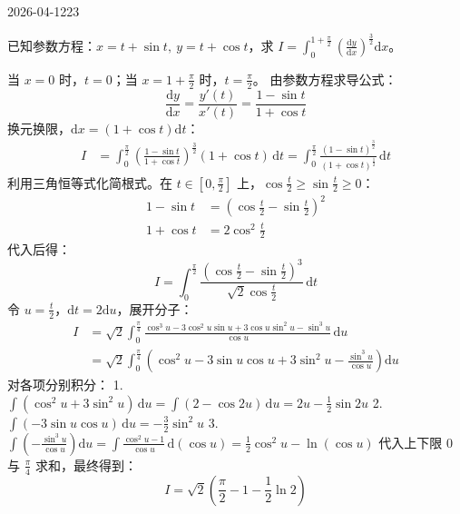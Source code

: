 \begin{mistake}{2026-04-12}{23}

\begin{problemcontent}
已知参数方程：\( x=t+\sin t,\ y=t+\cos t \)，求 \( \displaystyle I=\int_{0}^{1+\frac{\pi}{2}}\left(\frac{\mathrm{d}y}{\mathrm{d}x}\right)^{\frac{3}{2}}\mathrm{d}x \)。
\end{problemcontent}

\begin{solutioncontent}
当 \(x=0\) 时，\(t=0\)；当 \(x=1+\frac{\pi}{2}\) 时，\(t=\frac{\pi}{2}\)。
由参数方程求导公式：
\[
\frac{\mathrm{d}y}{\mathrm{d}x} = \frac{y'(t)}{x'(t)} = \frac{1-\sin t}{1+\cos t}
\]
换元换限，\(\mathrm{d}x = (1+\cos t)\mathrm{d}t\)：
\[
\begin{aligned}
I &= \int_{0}^{\frac{\pi}{2}} \left( \frac{1-\sin t}{1+\cos t} \right)^{\frac{3}{2}} (1+\cos t) \,\mathrm{d}t = \int_{0}^{\frac{\pi}{2}} \frac{(1-\sin t)^{\frac{3}{2}}}{(1+\cos t)^{\frac{1}{2}}} \,\mathrm{d}t
\end{aligned}
\]
利用三角恒等式化简根式。在 \(t \in [0, \frac{\pi}{2}]\) 上，\(\cos\frac{t}{2} \ge \sin\frac{t}{2} \ge 0\)：
\[
\begin{aligned}
1-\sin t &= \left(\cos\frac{t}{2} - \sin\frac{t}{2}\right)^2 \\
1+\cos t &= 2\cos^2\frac{t}{2}
\end{aligned}
\]
代入后得：
\[
I = \int_{0}^{\frac{\pi}{2}} \frac{\left(\cos\frac{t}{2} - \sin\frac{t}{2}\right)^3}{\sqrt{2}\cos\frac{t}{2}} \,\mathrm{d}t
\]
令 \(u = \frac{t}{2}\)，\(\mathrm{d}t = 2\mathrm{d}u\)，展开分子：
\[
\begin{aligned}
I &= \sqrt{2} \int_{0}^{\frac{\pi}{4}} \frac{\cos^3 u - 3\cos^2 u\sin u + 3\cos u\sin^2 u - \sin^3 u}{\cos u} \,\mathrm{d}u \\
  &= \sqrt{2} \int_{0}^{\frac{\pi}{4}} \left( \cos^2 u - 3\sin u\cos u + 3\sin^2 u - \frac{\sin^3 u}{\cos u} \right) \mathrm{d}u
\end{aligned}
\]
对各项分别积分：
1. \(\int (\cos^2 u + 3\sin^2 u)\,\mathrm{d}u = \int (2-\cos 2u)\,\mathrm{d}u = 2u - \frac{1}{2}\sin 2u\)
2. \(\int (-3\sin u\cos u)\,\mathrm{d}u = -\frac{3}{2}\sin^2 u\)
3. \(\int \left(-\frac{\sin^3 u}{\cos u}\right)\mathrm{d}u = \int \frac{\cos^2 u - 1}{\cos u}\,\mathrm{d}(\cos u) = \frac{1}{2}\cos^2 u - \ln(\cos u)\)
代入上下限 \(0\) 与 \(\frac{\pi}{4}\) 求和，最终得到：
\[
I = \sqrt{2}\left(\frac{\pi}{2} - 1 - \frac{1}{2}\ln 2\right)
\]
\end{solutioncontent}


\end{mistake}
